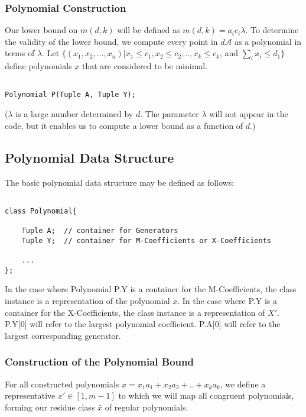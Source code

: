 \subsubsection{Polynomial Construction}

Our lower bound on $m(d, k)$ will be defined as $m(d, k) = a_{i}c_{i} \lambda$. To determine the validity of the lower bound, we compute every point in $d \mathcal{A}$ as a polynomial in terms of $\lambda$.\n
Let $ \{ (x_{1}, x_{2}, ... , x_{n}) \vert x_{1} \leq c_{1}, x_{2} \leq c_{2}, .. , x_{k} \leq c_{k}$, and $\sum_{i} x_{i} \leq d_{1} \}$ define polynomials $x$ that are considered to be minimal.\n

\begin{lstlisting}

Polynomial P(Tuple A, Tuple Y);

\end{lstlisting}

($\lambda$ is a large number determined by $d$. The parameter $\lambda$ will not appear in the code, but it enables us to compute a lower bound as a function of $d$.)\n

\subsection*{Polynomial Data Structure} The basic polynomial data structure may be defined as follows:

\begin{lstlisting}

class Polynomial{

    Tuple A;  // container for Generators
    Tuple Y;  // container for M-Coefficients or X-Coefficients

    ...
};

\end{lstlisting}

In the case where Polynomial P.Y is a container for the M-Coefficients, the class instance is a representation of the polynomial $x$. In the case where P.Y is a container for the X-Coefficients, the class instance is a representation of $X'$.
P.Y[0] will refer to the largest polynomial coefficient. P.A[0] will refer to the largest corresponding generator.

\subsubsection{Construction of the Polynomial Bound}

For all constructed polynomials $x = x_{1}a_{1} + x_{2}a_{2} + .. + x_{k}a_{k}$, we define a representative $x' \in [1, m-1]$ to which we will map all congruent polynomials, forming our residue class $\bar{x}$ of regular polynomials.\n

